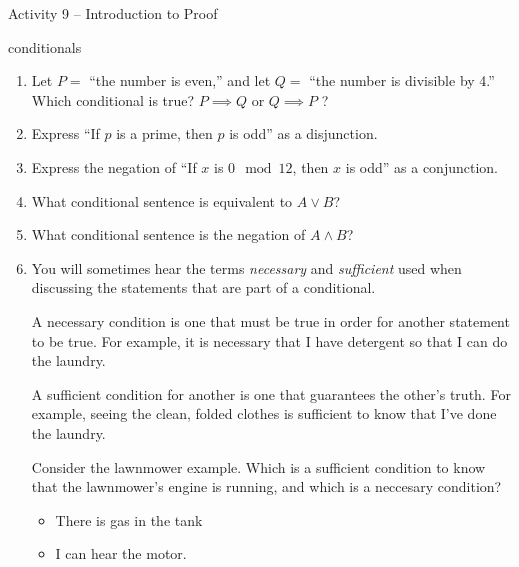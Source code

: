 \documentclass{amsart}
\begin{document}
\thispagestyle{empty}

\centerline{\Large Activity 9 -- Introduction to Proof}
\centerline{\large conditionals}

\bigskip
\Large


\begin{enumerate}

\item Let $P = $ ``the number is even,'' and let $Q =$ ``the number is divisible by 4.''  Which conditional is true?  $P \implies Q$ or $Q \implies P$ ?  

\vfill

\item Express ``If $p$ is a prime, then $p$ is odd'' as a disjunction.

\vfill

\item Express the negation of ``If $x$ is $0 \mod 12$, then $x$ is odd'' as a conjunction.

\vfill

\item What conditional sentence is equivalent to $A \lor B$?

\vfill

\item What conditional sentence is the negation of $A \land B$?

\vfill

\newpage

\item You will sometimes hear the terms {\em necessary} and {\em sufficient} used when discussing the statements that are part of a conditional.  

A necessary condition is one that must be true in order for another statement to be true.  For example, it is necessary that I have detergent so that I can do the laundry.

A sufficient condition for another is one that guarantees the other's truth. For example, seeing the clean, folded clothes is sufficient to know that I've done the laundry.

Consider the lawnmower example.  Which is a sufficient condition to know that the lawnmower's engine is running, and which is a neccesary condition?

\begin{itemize}
\item There is gas in the tank
\item I can hear the motor.
\end{itemize}


\end{enumerate}
\end{document}
